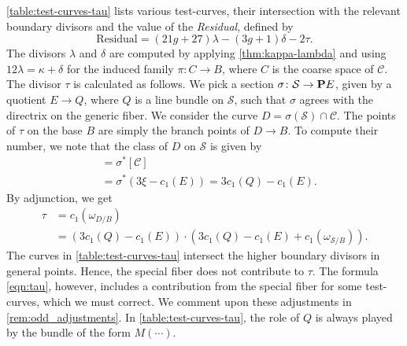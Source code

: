 \documentclass{amsart}
\renewcommand {\P}{{\bf P}}
\newcommand {\from}{{\colon}}
\newcommand{\orb}[1]{{\mathcal #1}}     %
\begin{document}
\autoref{table:test-curves-tau} lists various test-curves, their intersection with the relevant boundary divisors and the value of the \emph{Residual}, defined by
\[ \text{Residual} = (21g+27)\lambda - (3g+1)\delta - 2\tau.\] The divisors $\lambda$ and $\delta$ are computed by applying \autoref{thm:kappa-lambda} and using $12 \lambda = \kappa + \delta$ for the induced family $\pi \from C \to B$, where $C$ is the coarse space of $\orb C$. The divisor $\tau$ is calculated as follows. We pick a section $\sigma \from \orb S \to \P E$, given by a quotient $E \to Q$, where $Q$ is a line bundle on $\orb S$, such that $\sigma$ agrees with the directrix on the generic fiber. We consider the curve $D = \sigma(\orb S) \cap \orb C$. The points of $\tau$ on the base $B$ are simply the branch points of $D \to B$. To compute their number, we note that the class of $D$ on $\orb S$ is given by
\begin{align*}
  [D] &= \sigma^* [\orb C]  \\
  &= \sigma^* (3 \xi - c_1(E)) = 3 c_1(Q) - c_1(E).
\end{align*}
By adjunction, we get
\begin{equation}\label{eqn:tau}
  \begin{split}
  \tau &= c_1(\omega_{D/B}) \\
  &= (3c_1(Q) - c_1(E)) \cdot (3c_1(Q) - c_1(E) + c_1(\omega_{\orb     S/B})).
\end{split}
\end{equation}
The curves in \autoref{table:test-curves-tau} intersect the higher boundary divisors in general points. Hence, the special fiber does not contribute to $\tau$. The formula \eqref{eqn:tau}, however, includes a contribution from the special fiber for some test-curves, which we must correct. We comment upon these adjustments in \autoref{rem:odd_adjustments}. In \autoref{table:test-curves-tau}, the role of $Q$ is always played by the bundle of the form $M(\cdots)$.
\renewcommand{\arraystretch}{2}
\end{document}
